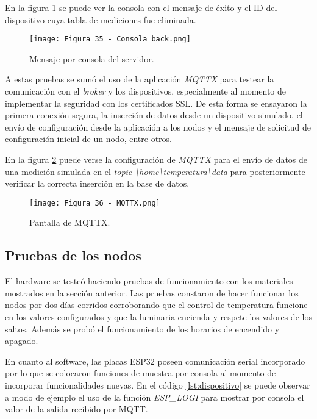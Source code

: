 En la figura \ref{fig:35} se puede ver la consola con el mensaje de éxito y el ID del dispositivo cuya tabla de mediciones fue eliminada.

\begin{figure}[h]
\centering
\texttt{[image: Figura 35 - Consola back.png]}
\caption[Prueba backend]{Mensaje por consola del servidor.}
\label{fig:35}
\end{figure}

A estas pruebas se sumó el uso de la aplicación \textit{MQTTX} para testear la comunicación con el \textit{broker} y los dispositivos, especialmente al momento de implementar la seguridad con los certificados SSL. De esta forma se ensayaron la primera conexión segura, la inserción de datos desde un dispositivo simulado, el envío de configuración desde la aplicación a los nodos y el mensaje de solicitud de configuración inicial de un nodo, entre otros.

En la figura \ref{fig:36} puede verse la configuración de \textit{MQTTX} para el envío de datos de una medición simulada en el \textit{topic \textbackslash home\textbackslash temperatura\textbackslash data} para posteriormente verificar la correcta inserción en la base de datos.

\begin{figure}[h]
\centering
\texttt{[image: Figura 36 - MQTTX.png]}
\caption[MQTTX]{Pantalla de MQTTX.}
\label{fig:36}
\end{figure}

\subsection{Pruebas de los nodos}

El hardware se testeó haciendo pruebas de funcionamiento con los materiales mostrados en la sección anterior. Las pruebas constaron de hacer funcionar los nodos por dos días corridos corroborando que el control de temperatura funcione en los valores configurados y que la luminaria encienda y respete los valores de los saltos. Además se probó el funcionamiento de los horarios de encendido y apagado.

En cuanto al software, las placas ESP32 poseen comunicación serial incorporado por lo que se colocaron funciones de muestra por consola al momento de incorporar funcionalidades nuevas. En el código  \ref{lst:dispositivo} se puede observar a modo de ejemplo el uso de la función \textit{ESP\_LOGI} para mostrar por consola el valor de la salida recibido por MQTT.

